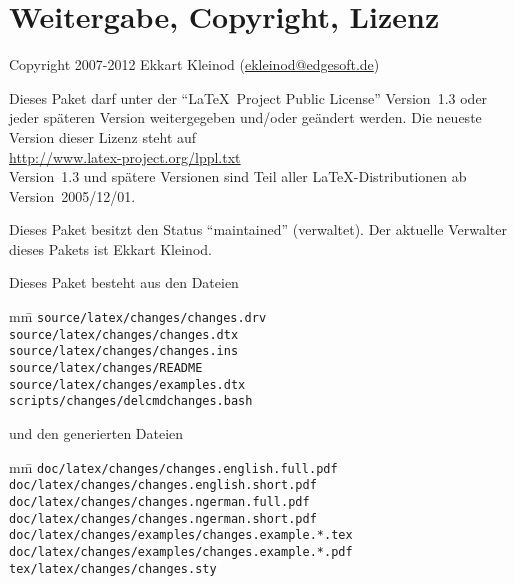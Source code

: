 \section{Weitergabe, Copyright, Lizenz}

Copyright 2007-2012 Ekkart Kleinod (\href{mailto:ekleinod@edgesoft.de}{ekleinod@edgesoft.de})

Dieses Paket darf unter der "`\LaTeX\ Project Public License"' Version~1.3 oder jeder späteren Version weitergegeben und/oder geändert werden.
Die neueste Version dieser Lizenz steht auf\\
\url{http://www.latex-project.org/lppl.txt}\\
Version~1.3 und spätere Versionen sind Teil aller \LaTeX-Distributionen ab Version~2005/12/01.

Dieses Paket besitzt den Status "`maintained"' (verwaltet).
Der aktuelle Verwalter dieses Pakets ist Ekkart Kleinod.

Dieses Paket besteht aus den Dateien

\begin{tabbing}
	mm\=\kill
	\>\texttt{source/latex/changes/changes.drv}\\
	\>\texttt{source/latex/changes/changes.dtx}\\
	\>\texttt{source/latex/changes/changes.ins}\\
	\>\texttt{source/latex/changes/README}\\
	\>\texttt{source/latex/changes/examples.dtx}\\

	\>\texttt{scripts/changes/delcmdchanges.bash}
\end{tabbing}

und den generierten Dateien

\begin{tabbing}
	mm\=\kill
	\>\texttt{doc/latex/changes/changes.english.full.pdf}\\
	\>\texttt{doc/latex/changes/changes.english.short.pdf}\\
	\>\texttt{doc/latex/changes/changes.ngerman.full.pdf}\\
	\>\texttt{doc/latex/changes/changes.ngerman.short.pdf}\\

	\>\texttt{doc/latex/changes/examples/changes.example.*.tex}\\
	\>\texttt{doc/latex/changes/examples/changes.example.*.pdf}\\

	\>\texttt{tex/latex/changes/changes.sty}
\end{tabbing}


